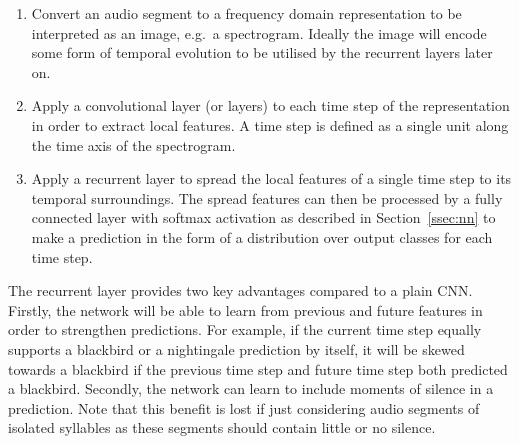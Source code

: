 \begin{enumerate}

  \item Convert an audio segment to a frequency domain representation to be
    interpreted as an image, e.g.\ a spectrogram. Ideally the image will encode
    some form of temporal evolution to be utilised by the recurrent layers later
    on.

  \item Apply a convolutional layer (or layers) to each time step of the
    representation in order to extract local features. A time step is defined as
    a single unit along the time axis of the spectrogram.

  \item Apply a recurrent layer to spread the local features of a single time
    step to its temporal surroundings. The spread features can then be processed
    by a fully connected layer with softmax activation as described in
    Section~\ref{ssec:nn} to make a prediction in the form of a distribution
    over output classes for each time step.

\end{enumerate}

The recurrent layer provides two key advantages compared to a plain CNN\@.
Firstly, the network will be able to learn from previous and future features in
order to strengthen predictions. For example, if the current time step equally
supports a blackbird or a nightingale prediction by itself, it will be skewed
towards a blackbird if the previous time step and future time step both
predicted a blackbird. Secondly, the network can learn to include moments of
silence in a prediction. Note that this benefit is lost if just considering
audio segments of isolated syllables as these segments should contain little or
no silence.
